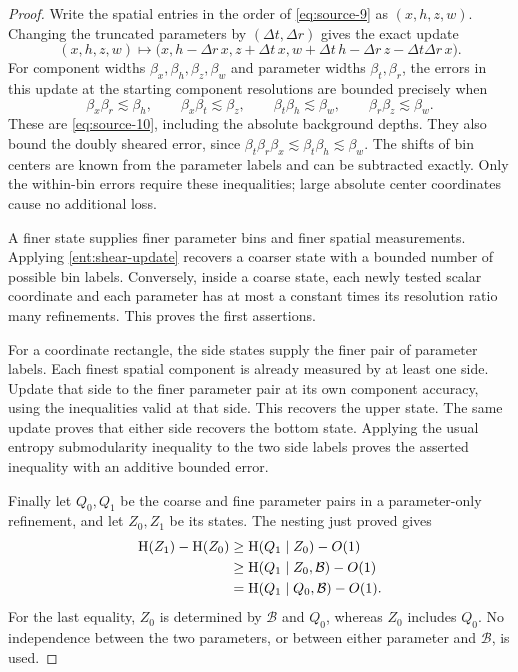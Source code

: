 \begin{proof}
Write the spatial entries in the order of
\eqref{eq:source-9} as $(x,h,z,w)$.  Changing the truncated parameters
by $(\Delta t,\Delta r)$ gives the exact update
\begin{equation}\label{ent:shear-update}
(x,h,z,w)\longmapsto
\bigl(x,h-\Delta r\,x,z+\Delta t\,x,
w+\Delta t\,h-\Delta r\,z-\Delta t\Delta r\,x\bigr).
\end{equation}
For component widths $\beta_x,\beta_h,\beta_z,\beta_w$ and parameter
widths $\beta_t,\beta_r$, the errors in this update at the starting
component resolutions are bounded precisely when
\[
\beta_x\beta_r\lesssim\beta_h,\qquad
\beta_x\beta_t\lesssim\beta_z,\qquad
\beta_t\beta_h\lesssim\beta_w,\qquad
\beta_r\beta_z\lesssim\beta_w.
\]
These are \eqref{eq:source-10}, including the absolute background
depths.  They also bound the doubly sheared error, since
$\beta_t\beta_r\beta_x\lesssim\beta_t\beta_h\lesssim\beta_w$.
The shifts of bin centers are known from the parameter labels and
can be subtracted exactly.  Only the within-bin errors require these
inequalities; large absolute center coordinates cause no additional
loss.

A finer state supplies finer parameter bins and finer spatial
measurements.  Applying \eqref{ent:shear-update} recovers a coarser
state with a bounded number of possible bin labels.  Conversely,
inside a coarse state, each newly tested scalar coordinate and each
parameter has at most a constant times its resolution ratio many
refinements.  This proves the first assertions.

For a coordinate rectangle, the side states supply the finer pair of
parameter labels.  Each finest spatial component is already measured
by at least one side.  Update that side to the finer parameter pair at
its own component accuracy, using the inequalities valid at that
side.  This recovers the upper state.  The same update proves that
either side recovers the bottom state.  Applying the usual entropy
submodularity inequality to the two side labels proves the asserted
inequality with an additive bounded error.

Finally let $Q_0,Q_1$ be the coarse and fine parameter pairs in a
parameter-only refinement, and let $Z_0,Z_1$ be its states.  The
nesting just proved gives
\begin{align*}
\operatorname{H}(Z_1)-\operatorname{H}(Z_0)
&\geq \operatorname{H}(Q_1\mid Z_0)-O(1)\\
&\geq \operatorname{H}(Q_1\mid Z_0,\mathcal B)-O(1)\\
&=\operatorname{H}(Q_1\mid Q_0,\mathcal B)-O(1).
\end{align*}
For the last equality, $Z_0$ is determined by $\mathcal B$ and $Q_0$,
whereas $Z_0$ includes $Q_0$.  No independence between the two
parameters, or between either parameter and $\mathcal B$, is used.
\end{proof}

